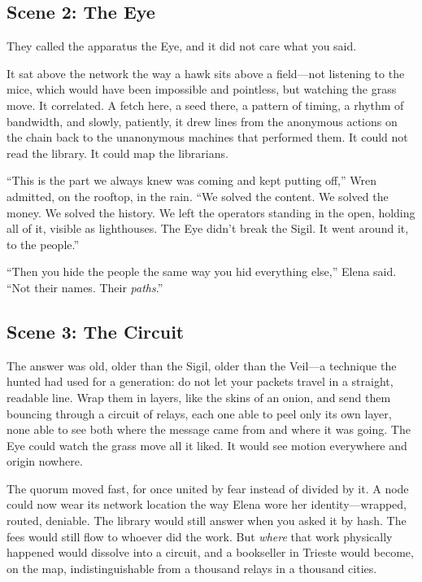 \hypertarget{scene-2-the-eye}{%
\subsection{Scene 2: The Eye}\label{scene-2-the-eye}}

They called the apparatus the Eye, and it did not care what you said.

It sat above the network the way a hawk sits above a field---not listening to the
mice, which would have been impossible and pointless, but watching the grass move.
It correlated. A fetch here, a seed there, a pattern of timing, a rhythm of
bandwidth, and slowly, patiently, it drew lines from the anonymous actions on the
chain back to the unanonymous machines that performed them. It could not read the
library. It could map the librarians.

``This is the part we always knew was coming and kept putting off,'' Wren admitted,
on the rooftop, in the rain. ``We solved the content. We solved the money. We
solved the history. We left the operators standing in the open, holding all of it,
visible as lighthouses. The Eye didn't break the Sigil. It went around it, to the
people.''

``Then you hide the people the same way you hid everything else,'' Elena said.
``Not their names. Their \emph{paths}.''

\hypertarget{scene-3-the-circuit}{%
\subsection{Scene 3: The
Circuit}\label{scene-3-the-circuit}}

The answer was old, older than the Sigil, older than the Veil---a technique the
hunted had used for a generation: do not let your packets travel in a straight,
readable line. Wrap them in layers, like the skins of an onion, and send them
bouncing through a circuit of relays, each one able to peel only its own layer,
none able to see both where the message came from and where it was going. The Eye
could watch the grass move all it liked. It would see motion everywhere and origin
nowhere.

The quorum moved fast, for once united by fear instead of divided by it. A node
could now wear its network location the way Elena wore her identity---wrapped,
routed, deniable. The library would still answer when you asked it by hash. The
fees would still flow to whoever did the work. But \emph{where} that work
physically happened would dissolve into a circuit, and a bookseller in Trieste
would become, on the map, indistinguishable from a thousand relays in a thousand
cities.

